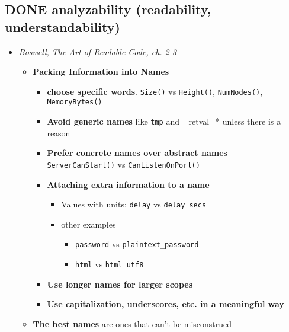 \documentclass[11pt]{article}
\begin{document}
\subsection{{\bfseries\sffamily DONE} analyzability (readability, understandability)}
\label{sec-3-4}
\begin{itemize}
\item \emph{Boswell, The Art of Readable Code, ch. 2-3}
\begin{itemize}
\item \textbf{Packing Information into Names}
\begin{itemize}
\item \textbf{choose specific words}. \texttt{Size()} vs \texttt{Height()}, \texttt{NumNodes()}, \texttt{MemoryBytes()}
\item \textbf{Avoid generic names} like \texttt{tmp} and =retval=* unless there is a reason
\item \textbf{Prefer concrete names over abstract names} - \texttt{ServerCanStart()} vs \texttt{CanListenOnPort()}
\item \textbf{Attaching extra information to a name}
\begin{itemize}
\item Values with units: \texttt{delay} vs \texttt{delay\_secs}
\item other examples
\begin{itemize}
\item \texttt{password} vs \texttt{plaintext\_password}
\item \texttt{html} vs \texttt{html\_utf8}
\end{itemize}
\end{itemize}
\item \textbf{Use longer names for larger scopes}
\item \textbf{Use capitalization, underscores, etc. in a meaningful way}
\end{itemize}
\item \textbf{The best names} are ones that can't be misconstrued
\end{itemize}
\end{itemize}
\end{document}
